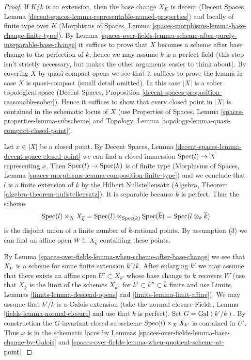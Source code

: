\begin{proof}
If $K/k$ is an extension, then the base change $X_K$ is
decent (Decent Spaces, Lemma
\ref{decent-spaces-lemma-representable-named-properties})
and locally of finite type
over $K$ (Morphisms of Spaces, Lemma
\ref{spaces-morphisms-lemma-base-change-finite-type}).
By Lemma \ref{spaces-over-fields-lemma-scheme-after-purely-inseparable-base-change}
it suffices to prove that $X$ becomes a scheme after base change to
the perfection of $k$, hence we may assume $k$ is a perfect field
(this step isn't strictly necessary, but makes the other arguments
easier to think about).
By covering $X$ by quasi-compact opens we see that it suffices to prove
the lemma in case $X$ is quasi-compact (small detail omitted).
In this case $|X|$ is a sober topological space
(Decent Spaces, Proposition
\ref{decent-spaces-proposition-reasonable-sober}).
Hence it suffices to show that every closed point in $|X|$
is contained in the schematic locus of $X$
(use Properties of Spaces, Lemma \ref{spaces-properties-lemma-subscheme} and
Topology, Lemma \ref{topology-lemma-quasi-compact-closed-point}).

\medskip\noindent
Let $x \in |X|$ be a closed point. By Decent Spaces, Lemma
\ref{decent-spaces-lemma-decent-space-closed-point}
we can find a closed immersion $\operatorname{Spec}(l) \to X$ representing $x$.
Then $\operatorname{Spec}(l) \to \operatorname{Spec}(k)$ is of finite type (Morphisms of Spaces,
Lemma \ref{spaces-morphisms-lemma-composition-finite-type}) and we
conclude that $l$ is a finite extension of $k$
by the Hilbert Nullstellensatz (Algebra, Theorem
\ref{algebra-theorem-nullstellensatz}). It is separable because
$k$ is perfect. Thus the scheme
$$
\operatorname{Spec}(l) \times_X X_{\overline{k}} =
\operatorname{Spec}(l) \times_{\operatorname{Spec}(k)} \operatorname{Spec}(\overline{k}) =
\operatorname{Spec}(l \otimes_k \overline{k})
$$
is the disjoint union of a finite number of $\overline{k}$-rational points.
By assumption (3) we can find an affine open $W \subset X_{\overline{k}}$
containing these points.

\medskip\noindent
By Lemma \ref{spaces-over-fields-lemma-when-scheme-after-base-change} we see that $X_{k'}$
is a scheme for some finite extension $k'/k$. After enlarging
$k'$ we may assume that there exists an affine open $U' \subset X_{k'}$
whose base change to $\overline{k}$ recovers $W$
(use that $X_{\overline{k}}$ is the limit of the schemes $X_{k''}$
for $k' \subset k'' \subset \overline{k}$ finite and use
Limits, Lemmas \ref{limits-lemma-descend-opens} and
\ref{limits-lemma-limit-affine}). We may assume
that $k'/k$ is a Galois extension (take the normal closure
Fields, Lemma \ref{fields-lemma-normal-closure} and use
that $k$ is perfect). Set $G = \text{Gal}(k'/k)$.
By construction the $G$-invariant closed subscheme
$\operatorname{Spec}(l) \times_X X_{k'}$ is contained in $U'$.
Thus $x$ is in the schematic locus by
Lemmas \ref{spaces-over-fields-lemma-base-change-by-Galois} and
\ref{spaces-over-fields-lemma-when-quotient-scheme-at-point}.
\end{proof}

